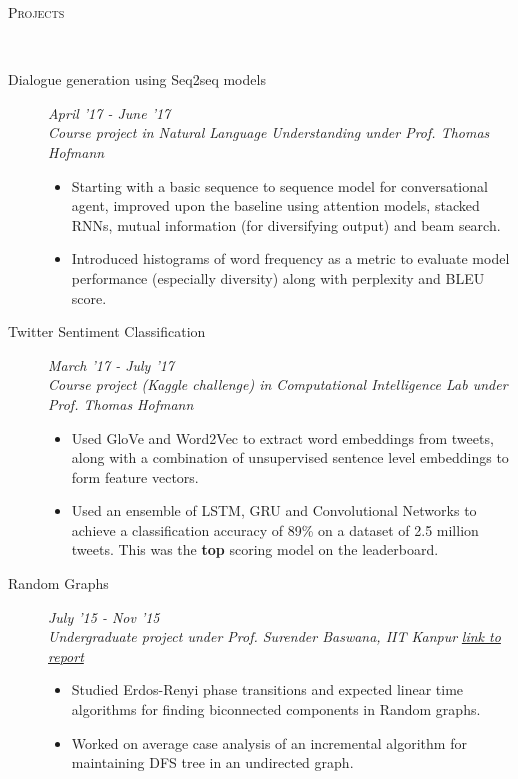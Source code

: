 \documentclass[9pt]{article}
\newenvironment{changemargin}[2]{%
  \begin{list}{}{%
      \setlength{\topsep}{0pt}%
    \setlength{\leftmargin}{#1}%
    \setlength{\rightmargin}{#2}%
    \setlength{\listparindent}{\parindent}%
  \setlength{\itemindent}{\parindent}%
    \setlength{\parsep}{\parskip}%
    }%
  \item[]}{\end{list}
    }
\newcommand{\lineover}{
  \begin{changemargin}{-0.05in}{-0.10in}
    \vspace*{-9pt}
    \hrulefill \\
    \vspace*{-2pt}
  \end{changemargin}
}
\newcommand{\header}[1]{
  \begin{changemargin}{-0.5in}{-0.5in}
    \scshape{#1}\\
        \lineover
  \end{changemargin}
}
\newenvironment{body} {
  \vspace*{-16pt}
        \begin{changemargin}{-0.6in}{-0.65in}
        }	
        {\end{changemargin}
}
\begin{document}
\header{Projects}
\begin{body}
  \vspace{14pt}

  \begin{description}
    \item[\normalsize{Dialogue generation using Seq2seq models}] \hfill \textit{April '17 - June '17} \\
      \textit{Course project in Natural Language Understanding under Prof. Thomas Hofmann}
      \begin{itemize}
        \item Starting with a basic sequence to sequence model for conversational
          agent, improved upon the baseline using attention models, stacked RNNs,
          mutual information (for diversifying output) and beam search.
        \item Introduced histograms of word frequency as a metric to evaluate 
          model performance (especially diversity) along with perplexity and BLEU 
          score.
      \end{itemize}

    \item[\normalsize{Twitter Sentiment Classification}] \hfill \textit{March '17 - July '17} \\
      \textit{Course project (Kaggle challenge) in Computational Intelligence Lab
      under Prof. Thomas Hofmann}
      \begin{itemize}
        \item Used GloVe and Word2Vec to extract word embeddings from tweets, 
          along with a combination of unsupervised sentence level embeddings to
          form feature vectors.
        \item Used an ensemble of LSTM, GRU and Convolutional Networks
          to achieve a classification accuracy of 89\% on a dataset of 2.5 million
          tweets. This was the {\bf top} scoring model on the leaderboard. 
      \end{itemize}

    \item[\normalsize{Random Graphs}]	\hfill 	\textit{July '15 - Nov '15} \\
      \textit{Undergraduate project under Prof. Surender Baswana, IIT Kanpur} 
      \hfill \href{https:sshekh.github.io/www/cs498a/report.pdf}{\textit{\textcolor{ProcessBlue}{link to report}}}
    \begin{itemize}
      \item Studied Erdos-Renyi phase transitions and expected linear time 
        algorithms for finding biconnected components in Random graphs.
      \item Worked on average case analysis of an incremental algorithm for 
        maintaining DFS tree in an undirected graph.
    \end{itemize}


\end{description}
\end{body}
\end{document}
